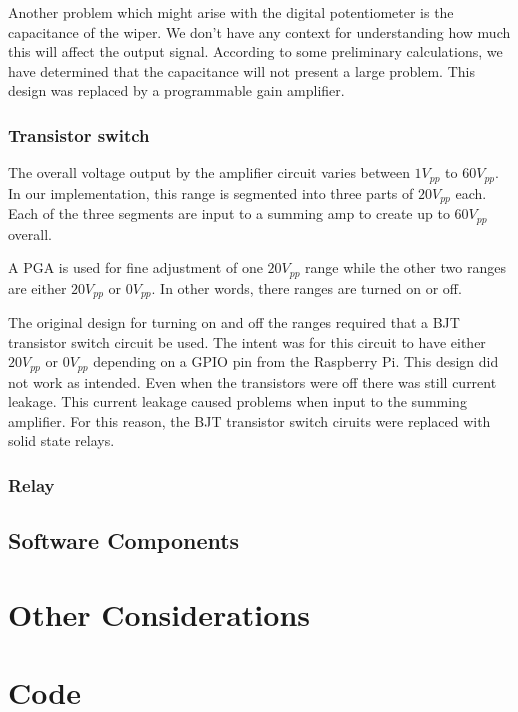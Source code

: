 \documentclass{article}	%
\begin{document}
Another problem which might arise with the digital potentiometer is the capacitance of the wiper. We don’t have any context for understanding how much this will affect the output signal. According to some preliminary calculations, we have determined that the capacitance will not present a large problem.
This design was replaced by a programmable gain amplifier.

\subsubsection{Transistor switch}
The overall voltage output by the amplifier circuit
varies between $1V_{pp}$ to $60V_{pp}$.
In our implementation,
this range is segmented into three parts of $20V_{pp}$ each.
Each of the three segments are input to a summing amp to
create up to $60V_{pp}$ overall.

A PGA is used for fine adjustment of one $20V_{pp}$ range while
the other two ranges are either $20V_{pp}$ or $0V_{pp}$.
In other words,
there ranges are turned on or off.

The original design for turning on and off the ranges
required that a BJT transistor switch circuit be used.
The intent was for this circuit to have either $20V_{pp}$ or $0V_{pp}$
depending on a GPIO pin from the Raspberry Pi.
This design did not work as intended.
Even when the transistors were off there was still current leakage.
This current leakage caused problems when input to the summing amplifier.
For this reason, the BJT transistor switch ciruits were replaced with solid state relays.

\subsubsection{Relay}


\subsection{Software Components}

\newpage
\section{Other Considerations}

\newpage
\section{Code}

\end{document}

